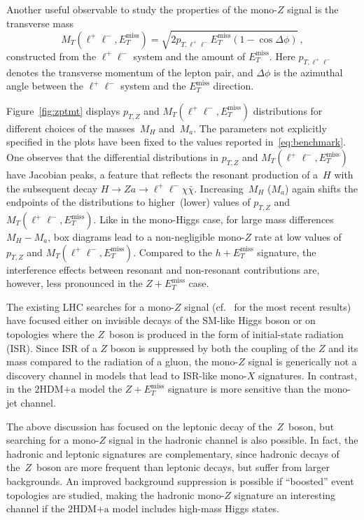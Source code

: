 \documentclass[a4paper, 11pt,notoc]{article}
\newcommand{\MET}{\ensuremath{E_T^\mathrm{miss}}\xspace}
\newcommand{\ma}{\ensuremath{M_{a}}\xspace}
\newcommand{\mH}{\ensuremath{M_{H}}\xspace}
\newcommand{\hdma}{\ensuremath{\textrm{2HDM+a}}\xspace}
\begin{document}
Another useful observable to study the properties of the mono-$Z$ signal is the transverse mass 
\begin{equation} \label{eq:transversemass}
M_T (\ell^+ \ell^-,\MET) = \sqrt{2 p_{T, \ell^+ \ell^-}  \MET  \left ( 1- \cos \Delta \phi \right )} \,,
\end{equation}
constructed from the $\ell^+ \ell^-$ system and the amount of $\MET$. Here $p_{T, \ell^+ \ell^-}$ denotes the transverse momentum of the lepton pair, and $\Delta \phi$ is the azimuthal angle between the $\ell^+ \ell^-$ system and the $\MET$ direction.

Figure~\ref{fig:zptmt} displays  $p_{T,Z}$ and $M_T(\ell^+ \ell^-, \MET)$ distributions for different choices of the masses~$M_H$ and~$M_a$. The parameters not explicitly specified in the plots have been  fixed to the values reported in~\eqref{eq:benchmark}. One observes that the differential distributions in $p_{T,Z}$ and $M_T(\ell^+ \ell^-, \MET)$ have Jacobian peaks, a feature that  reflects the resonant production of a~$H$ with the subsequent decay $H \to Z a \to \ell^+ \ell^- \chi \bar \chi$.  Increasing~$\mH$ ($\ma$) again shifts the endpoints of the distributions to higher~(lower) values of $p_{T,Z}$ and $M_T(\ell^+ \ell^-, \MET)$. Like in the mono-Higgs case, for large mass differences $M_H - M_a$, box diagrams lead to a non-negligible mono-$Z$ rate at low values of $p_{T,Z}$ and $M_T(\ell^+ \ell^-, \MET)$. Compared to the $h + \MET$ signature, the interference effects between resonant and non-resonant contributions  are, however,  less pronounced  in  the $Z + \MET$  case. 

The existing LHC searches for a mono-$Z$ signal (cf.~\cite{Aaboud:2017bja,Sirunyan:2017qfc} for the most recent results) have  focused either on invisible decays of the SM-like Higgs boson or on topologies where the $Z$~boson is produced in the form of initial-state radiation (ISR).  Since ISR of a $Z$ boson is suppressed by both the coupling of the $Z$ and its mass compared to the radiation of a gluon, the mono-$Z$ signal is generically not a discovery channel in models that lead to ISR-like mono-$X$ signatures. In contrast, in the \hdma model the $Z+\MET$ signature is more sensitive than the mono-jet channel.

The above discussion has focused on the leptonic decay of the~$Z$~boson, but searching for a mono-$Z$ signal in the hadronic channel is also possible. In fact, the hadronic and leptonic signatures  are complementary, since hadronic decays of the~$Z$~boson are more frequent than leptonic decays, but suffer from larger backgrounds. An improved background suppression is possible if ``boosted'' event topologies are studied, making the hadronic mono-$Z$ signature an interesting channel if the \hdma model includes high-mass Higgs states. 
\end{document}
